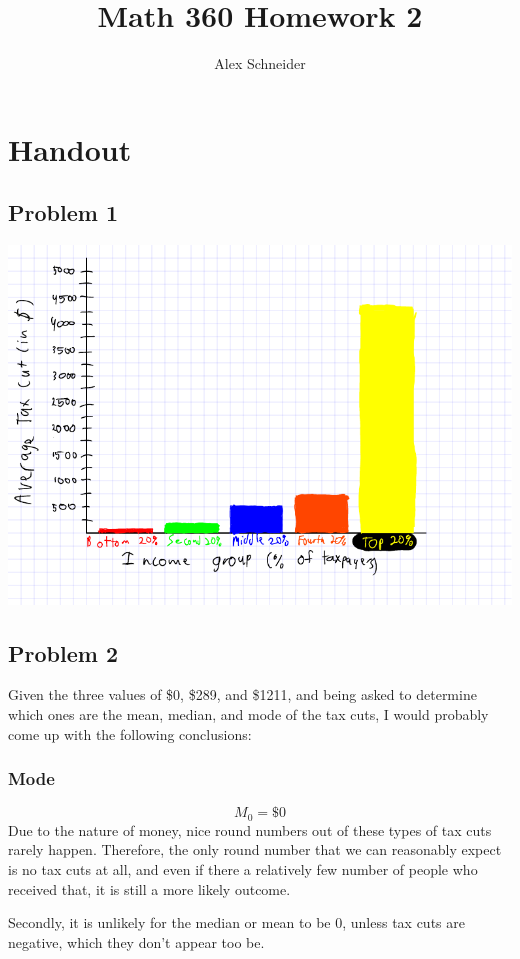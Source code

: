 \documentclass[11pt]{article}
\title{Math 360 Homework 2}
\author{Alex Schneider}
\begin{document}
\maketitle
\section*{Handout}
\subsection*{Problem 1}
\includegraphics{homework2_problem1_bargraph}

\subsection*{Problem 2}
Given the three values of \$0, \$289, and \$1211, and being asked to determine which
ones are the mean, median, and mode of the tax cuts, I would probably come up
with the following conclusions:

\subsubsection*{Mode}
\[M_0 = \$0\]
Due to the nature of money, nice round numbers out of these types of tax cuts
rarely happen. Therefore, the only round number that we can reasonably expect
is no tax cuts at all, and even if there a relatively few number of people who
received that, it is still a more likely outcome. 

Secondly, it is unlikely for the median or mean to be 0, unless tax cuts are
negative, which they don't appear too be. 
\end{document}
